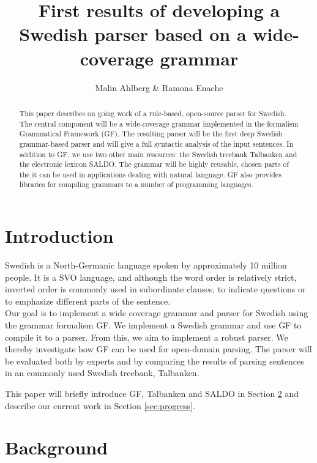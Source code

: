 \documentclass[submission]{eptcs} %
\title{First results of developing a Swedish parser based on a wide-coverage grammar}
\author{Malin Ahlberg \& Ramona Enache
\institute{Department of Computer Science \& Engineering, Gothenburg University, Sweden}
}
\begin{document}
\maketitle

\begin{abstract}
This paper describes on going work of a rule-based, open-source
parser for Swedish. The central component will be a wide-coverage grammar
implemented in the formalism Grammatical Framework (GF). The
resulting parser will be the first deep Swedish grammar-based parser  and
will give a full syntactic analysis of the input sentences.
In addition to GF, we use two other main resources: the Swedish
treebank Talbanken and the electronic lexicon SALDO.
The grammar will be highly reusable, chosen 
parts of the it can be used in applications dealing with
natural language. GF also provides libraries for compiling
grammars to a number of programming languages.

\end{abstract}

\section{Introduction}
Swedish is a North-Germanic language spoken by approximately 10 million people.
It is a SVO language, and although the word order is relatively strict,
inverted order is commonly used
in subordinate clauses, to indicate questions or to emphasize different parts of the sentence. \\
Our goal is to implement a wide coverage grammar and parser for Swedish
using the grammar formalism GF. 
We implement a Swedish grammar and use GF to compile it to a parser.
From this, we aim to implement a robust parser. 
We thereby investigate how GF
can be used for open-domain parsing.
The parser will be evaluated both by experts and by comparing the results of
parsing sentences in an commonly used Swedish treebank, Talbanken.

This paper will briefly introduce GF, Talbanken and SALDO in Section \ref{sec:background}
and describe our current work in Section \ref{sec:progress}.

\section{Background}
\label{sec:background}
\end{document}

